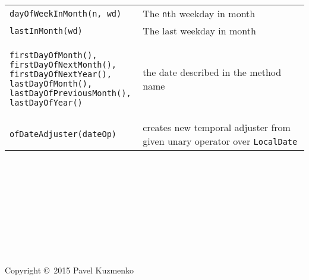 \documentclass[10pt,landscape]{article}
\begin{document}
\begin{multicols}{2}
\begin{tabular}{@{}m{\the\DefaultColLen}@{}m{\linewidth-\the\DefaultColLen}@{}}
\verb!dayOfWeekInMonth(n, wd)! & The \verb!n!th weekday in month\\

\verb!lastInMonth(wd)! & The last weekday in month\\

\begin{minipage}[t]{\linewidth}
\begin{verbatim}
firstDayOfMonth(), 
firstDayOfNextMonth(),
firstDayOfNextYear(), 
lastDayOfMonth(),
lastDayOfPreviousMonth(), 
lastDayOfYear()
\end{verbatim}
\end{minipage} & the date described in the method name\\

\verb!ofDateAdjuster(dateOp)! & creates new temporal adjuster from given unary operator over \verb!LocalDate!
\end{tabular}

~\\
~\\
~\\
~\\
~\\
~\\
~\\
~\\
~\\

Copyright \copyright\ 2015 Pavel Kuzmenko


\end{multicols}
\end{document}
